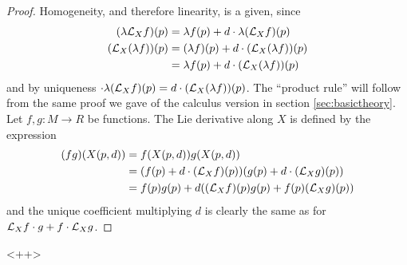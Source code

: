 \begin{proof}
  Homogeneity, and therefore linearity, is a given, since
  \begin{align*}
    (\lambda\mathcal L_Xf)(p)    &= \lambda f(p) + d\cdot\lambda(\mathcal L_Xf)(p)      \\
    (\mathcal L_X(\lambda f))(p) &= (\lambda f)(p) + d\cdot(\mathcal L_X(\lambda f))(p) \\
                           &= \lambda f(p) + d\cdot(\mathcal L_X(\lambda f))(p)
  \end{align*}
  and by uniqueness \( \cdot\lambda(\mathcal L_Xf)(p) = d\cdot(\mathcal L_X(\lambda f))(p) \). The ``product rule'' will follow from the same proof we gave of the calculus version in section \ref{sec:basictheory}. Let \( f,g:M\to R \) be functions. The Lie derivative along \( X \) is defined by the expression
  \begin{align*}
    (fg)(X(p,d)) &= f(X(p,d))g(X(p,d))                                     \\
                 &= (f(p) + d\cdot(\mathcal L_Xf)(p))(g(p) + d\cdot(\mathcal L_Xg)(p)) \\
		 &= f(p)g(p) + d((\mathcal L_Xf)(p)g(p) + f(p)(\mathcal L_Xg)(p))
  \end{align*}
  and the unique coefficient multiplying \( d \) is clearly the same as for \( \mathcal L_Xf\cdot g + f\cdot\mathcal L_Xg \).
\end{proof}<++>
